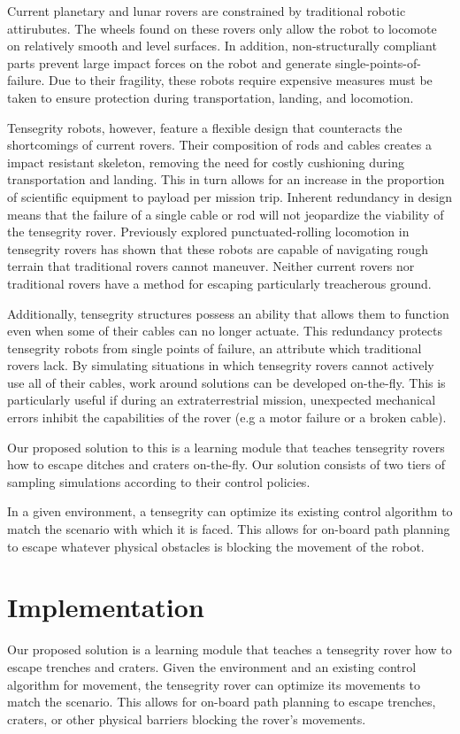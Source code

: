 \documentclass{llncs}
\begin{document}
Current planetary and lunar rovers are constrained by traditional robotic attirubutes. 
The wheels found on these rovers only allow the robot to locomote on relatively smooth and level surfaces. 
In addition, non-structurally compliant parts prevent large impact forces on the robot and generate single-points-of-failure.
Due to their fragility, these robots require expensive measures must be taken to ensure protection during transportation, landing, and locomotion.

Tensegrity robots, however, feature a flexible design that counteracts the shortcomings of current rovers.
Their composition of rods and cables creates a impact resistant skeleton, removing the need for costly cushioning during transportation and landing.
This in turn allows for an increase in the proportion of scientific equipment to payload per mission trip.
Inherent redundancy in design means that the failure of a single cable or rod will not jeopardize the viability of the tensegrity rover.
Previously explored punctuated-rolling locomotion in tensegrity rovers has shown that these robots are capable of navigating rough terrain that traditional rovers cannot maneuver\cite{Iscen2013a}. 
Neither current rovers nor traditional rovers have a method for escaping particularly treacherous ground.

Additionally, tensegrity structures possess an ability that allows them to function even when some of their cables can no longer actuate.
This redundancy protects tensegrity robots from single points of failure, an attribute which traditional rovers lack.
By simulating situations in which tensegrity rovers cannot actively use all of their cables, work around solutions can be developed on-the-fly.
This is particularly useful if during an extraterrestrial mission, unexpected mechanical errors inhibit the capabilities of the rover (e.g a motor failure or a broken cable).

Our proposed solution to this is a learning module that teaches tensegrity rovers how to escape ditches and craters on-the-fly.
Our solution consists of two tiers of sampling simulations according to their control policies.

In a given environment, a tensegrity can optimize its existing control algorithm to match the scenario with which it is faced.
This allows for on-board path planning to escape whatever physical obstacles is blocking the movement of the robot.

\section{Implementation}
\label{implementSection}
Our proposed solution is a learning module that teaches a tensegrity rover how to escape trenches and craters.
Given the environment and an existing control algorithm for movement, the tensegrity rover can optimize its movements to match the scenario. 
This allows for on-board path planning to escape trenches, craters, or other physical barriers blocking the rover's movements.
\end{document}
